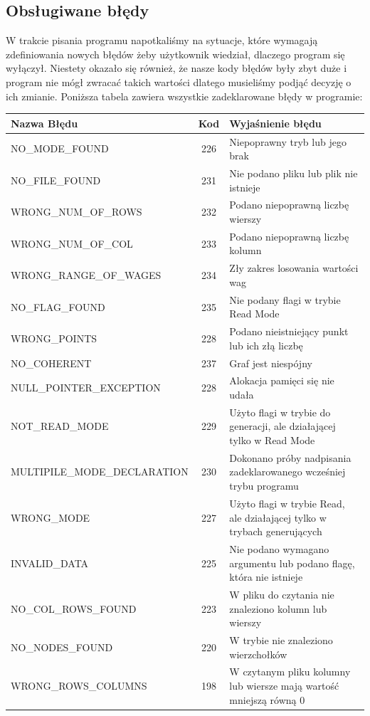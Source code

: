 \documentclass[10pt, a4paper]{report}
\begin{document}
    \subsection{Obsługiwane błędy}
    W trakcie pisania programu napotkaliśmy na sytuacje, które wymagają zdefiniowania nowych błędów żeby użytkownik wiedział, dlaczego program się wyłączył.
    Niestety okazało się również, że nasze kody błędów były zbyt duże i program nie mógł zwracać takich wartości dlatego musieliśmy podjąć decyzję o ich zmianie.
    \newline Poniższa tabela zawiera wszystkie zadeklarowane błędy w programie:
    \newline
    \begin{tabularx}{\textwidth}{ l|c|X } 
        \hline Nazwa Błędu & Kod & Wyjaśnienie błędu\\ 
        \hline NO\_MODE\_FOUND & 226 & Niepoprawny tryb lub jego brak\\ 
        \hline NO\_FILE\_FOUND & 231 & Nie podano pliku lub plik nie istnieje\\ 
        \hline WRONG\_NUM\_OF\_ROWS & 232 & Podano niepoprawną liczbę wierszy\\
        \hline WRONG\_NUM\_OF\_COL & 233 & Podano niepoprawną liczbę kolumn\\
        \hline WRONG\_RANGE\_OF\_WAGES & 234 & Zły zakres losowania wartości wag\\
        \hline NO\_FLAG\_FOUND & 235 & Nie podany flagi w trybie Read Mode\\
        \hline WRONG\_POINTS & 228 & Podano nieistniejący punkt lub ich złą liczbę\\
        \hline NO\_COHERENT & 237 & Graf jest niespójny \\
        \hline NULL\_POINTER\_EXCEPTION & 228 & Alokacja pamięci się nie udała\\
        \hline NOT\_READ\_MODE & 229 & Użyto flagi w trybie do generacji, ale działającej tylko w Read Mode\\
        \hline MULTIPILE\_MODE\_DECLARATION & 230 & Dokonano próby nadpisania zadeklarowanego wcześniej trybu programu\\
        \hline WRONG\_MODE & 227 & Użyto flagi w trybie Read, ale działającej tylko w trybach generujących\\
        \hline INVALID\_DATA & 225 & Nie podano wymagano argumentu lub podano flagę, która nie istnieje\\
        \hline NO\_COL\_ROWS\_FOUND & 223 & W pliku do czytania nie znaleziono kolumn lub wierszy\\
        \hline NO\_NODES\_FOUND & 220 & W trybie nie znaleziono wierzchołków\\
        \hline WRONG\_ROWS\_COLUMNS & 198 & W czytanym pliku kolumny lub wiersze mają wartość mniejszą równą 0\\
        \hline
    \end{tabularx}
    
\end{document}
